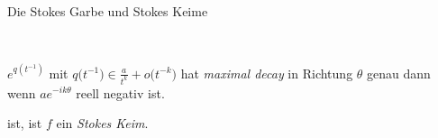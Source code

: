 \begin{frame}{Die Stokes Garbe und Stokes Keime}
\begin{defn}
\begin{itemize}
\begin{enumerate}
{\begin{minipage}{\textwidth}
\begin{flushright}
              \begin{minipage}{.6\textwidth}
                ~
                \vspace{-2em}
                \begin{defn}
                  $e^{q(t^{-1})}$ mit
                  $q\bigl(t^{-1}\bigr)\in\frac{a}{t^{k}}+o\bigl(t^{-k}\bigr)$
                  hat \emph{maximal decay} in Richtung
                    \boldmath$\theta$ genau dann wenn $ae^{-ik\theta}$ reell
                  negativ ist.
                \end{defn}
              \end{minipage}
            \end{flushright}
          \end{minipage}
        }
      \end{enumerate}
      ist, ist $f$ ein \emph{Stokes Keim}.
    \end{itemize}
  \end{defn}
\end{frame}

